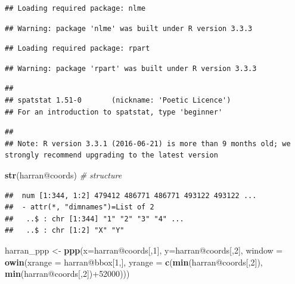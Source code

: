 \documentclass[]{article}
\newenvironment{Shaded}{\begin{snugshade}}{\end{snugshade}}
\newcommand{\KeywordTok}[1]{\textcolor[rgb]{0.13,0.29,0.53}{\textbf{{#1}}}}
\newcommand{\DataTypeTok}[1]{\textcolor[rgb]{0.13,0.29,0.53}{{#1}}}
\newcommand{\DecValTok}[1]{\textcolor[rgb]{0.00,0.00,0.81}{{#1}}}
\newcommand{\StringTok}[1]{\textcolor[rgb]{0.31,0.60,0.02}{{#1}}}
\newcommand{\CommentTok}[1]{\textcolor[rgb]{0.56,0.35,0.01}{\textit{{#1}}}}
\newcommand{\NormalTok}[1]{{#1}}
\begin{document}
\begin{verbatim}
## Loading required package: nlme
\end{verbatim}

\begin{verbatim}
## Warning: package 'nlme' was built under R version 3.3.3
\end{verbatim}

\begin{verbatim}
## Loading required package: rpart
\end{verbatim}

\begin{verbatim}
## Warning: package 'rpart' was built under R version 3.3.3
\end{verbatim}

\begin{verbatim}
## 
## spatstat 1.51-0       (nickname: 'Poetic Licence') 
## For an introduction to spatstat, type 'beginner'
\end{verbatim}

\begin{verbatim}
## 
## Note: R version 3.3.1 (2016-06-21) is more than 9 months old; we strongly recommend upgrading to the latest version
\end{verbatim}

\begin{Shaded}
\begin{Highlighting}[]
\KeywordTok{str}\NormalTok{(harran@coords) }\CommentTok{# structure}
\end{Highlighting}
\end{Shaded}

\begin{verbatim}
##  num [1:344, 1:2] 479412 486771 486771 493122 493122 ...
##  - attr(*, "dimnames")=List of 2
##   ..$ : chr [1:344] "1" "2" "3" "4" ...
##   ..$ : chr [1:2] "X" "Y"
\end{verbatim}

\begin{Shaded}
\begin{Highlighting}[]
\NormalTok{harran_ppp <-}\StringTok{ }\KeywordTok{ppp}\NormalTok{(}\DataTypeTok{x=}\NormalTok{harran@coords[,}\DecValTok{1}\NormalTok{],}
                  \DataTypeTok{y=}\NormalTok{harran@coords[,}\DecValTok{2}\NormalTok{],}
                  \DataTypeTok{window =} \KeywordTok{owin}\NormalTok{(}\DataTypeTok{xrange =} \NormalTok{harran@bbox[}\DecValTok{1}\NormalTok{,],}
                                \DataTypeTok{yrange =} \KeywordTok{c}\NormalTok{(}\KeywordTok{min}\NormalTok{(harran@coords[,}\DecValTok{2}\NormalTok{]),}
                                           \KeywordTok{min}\NormalTok{(harran@coords[,}\DecValTok{2}\NormalTok{])+}\DecValTok{52000}\NormalTok{)))}
\end{Highlighting}
\end{Shaded}
\end{document}
